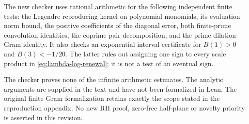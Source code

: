 The new checker  uses rational
arithmetic for the following independent finite tests:
the Legendre reproducing kernel on polynomial monomials,
its evaluation norm bound, the positive coefficients of the
diagonal error, both finite-prime convolution identities,
the coprime-pair decomposition, and the prime-dilation Gram
identity. It also checks an exponential interval certificate
for \(B(1)>0\) and \(B(3)<-1/20\).
The latter rules out assigning one sign to every scale
product in \eqref{eq:lambda-log-renewal}; it is not a test
of an eventual sign.

The checker proves none of the infinite arithmetic estimates.
The analytic arguments are supplied in the text and have
not been formalized in Lean. The original finite Gram
formalization retains exactly the scope stated in the
reproduction appendix. No new RH proof, zero-free
half-plane or novelty priority is asserted in this revision.

